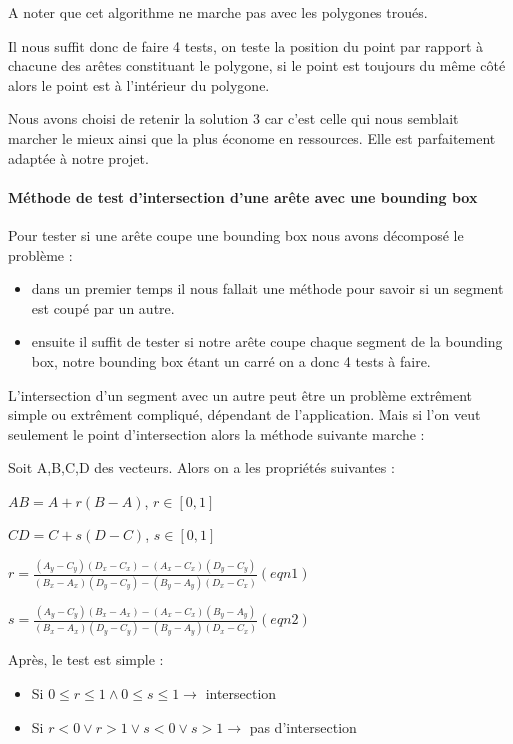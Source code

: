 \documentclass[a4paper,12pt]{report}
\begin{document}
A noter que cet algorithme ne marche pas avec les polygones troués. 

Il nous suffit donc de faire 4 tests, on teste la position du point par rapport à chacune des arêtes constituant le polygone, si le point est toujours du même côté alors le point est à l'intérieur du polygone.

Nous avons choisi de retenir la solution 3 car c'est celle qui nous semblait marcher le mieux ainsi que la plus économe en ressources. Elle est parfaitement adaptée à notre projet.

\paragraph{Méthode de test d'intersection d'une arête avec une bounding box }


Pour tester si une arête coupe une bounding box nous avons décomposé le problème :
\begin{itemize}
 \item dans un premier temps il nous fallait une méthode pour savoir si un segment est coupé par un autre.
 \item ensuite il suffit de tester si notre arête coupe chaque segment de la bounding box, notre bounding box étant un carré on a donc 4 tests à faire.
\end{itemize}

L'intersection d'un segment avec un autre peut être un problème extrêment simple ou extrêment compliqué, dépendant de l'application. 
Mais si l'on veut seulement le point d'intersection alors la méthode suivante marche :

Soit A,B,C,D des vecteurs. Alors on a les propriétés suivantes :

$AB=A+r(B-A)$, $r \in [0,1]$

$CD=C+s(D-C)$, $s \in [0,1]$

$r = \frac{(A_{y}-C_{y})(D_{x}-C_{x})-(A_{x}-C_{x})(D_{y}-C_{y})}{(B_{x}-A_{x})(D_{y}-C_{y})-(B_{y}-A_{y})(D_{x}-C_{x})} (eqn 1)$

$s = \frac{(A_{y}-C_{y})(B_{x}-A_{x})-(A_{x}-C_{x})(B_{y}-A_{y})}{(B_{x}-A_{x})(D_{y}-C_{y})-(B_{y}-A_{y})(D_{x}-C_{x})} (eqn 2)$

Après, le test est simple : 
\begin{itemize}
 \item Si $0\le r \le 1 \wedge 0 \le s \le 1 \rightarrow$ intersection
 \item Si $r<0 \vee r>1 \vee s<0 \vee s>1 \rightarrow$ pas d'intersection
\end{itemize}
\end{document}
